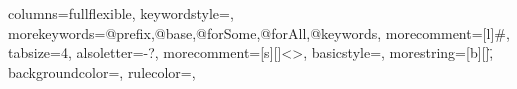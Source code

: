 \usepackage{fancyvrb,newverbs}


\let\oldtexttt\texttt
\renewcommand{\texttt}[1]{
  \colorbox{bggrey}{\oldtexttt{#1}}
}

\usepackage[listings,skins,breakable,xparse]{tcolorbox}
\renewenvironment{quote}{\begin{myquote}}{\end{myquote}}



\usepackage[listings,skins,breakable,xparse]{tcolorbox}


{
    columns=fullflexible,
    keywordstyle=\color{red},
    morekeywords={@prefix,@base,@forSome,@forAll,@keywords},
    morecomment=[l]{\#},
    tabsize=4,
    alsoletter={-?}, %
    morecomment=[s][\color{blue}]{<}{>},
    basicstyle=\ttfamily\color{black},
    morestring=[b][\color{black}]\",
    backgroundcolor=\color{coding},
    rulecolor=\color{coding},
}










